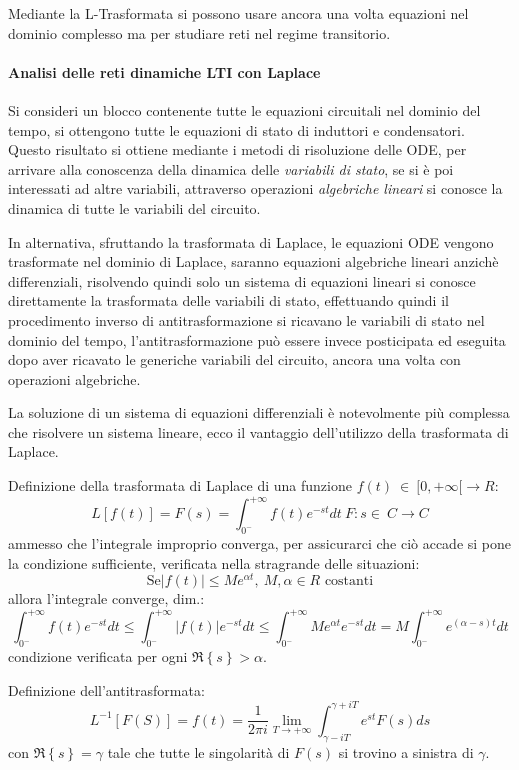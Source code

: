 Mediante la L-Trasformata si possono usare ancora una volta equazioni nel dominio complesso ma per 
studiare reti nel regime transitorio.

\paragraph{Analisi delle reti dinamiche LTI con Laplace}
Si consideri un blocco contenente tutte le equazioni circuitali nel dominio del tempo,
si ottengono tutte le equazioni di stato di induttori e condensatori.
Questo risultato si ottiene mediante i metodi di risoluzione delle ODE, per arrivare alla conoscenza
della dinamica delle \textit{variabili di stato}, se si è poi interessati ad altre variabili, attraverso
operazioni \textit{algebriche lineari} si conosce la dinamica di tutte le variabili del circuito.

In alternativa, sfruttando la trasformata di Laplace, le equazioni ODE vengono trasformate nel dominio
di Laplace, saranno equazioni algebriche lineari anzichè differenziali, risolvendo quindi solo un sistema
di equazioni lineari si conosce direttamente la trasformata delle variabili di stato, effettuando quindi
il procedimento inverso di antitrasformazione si ricavano le variabili di stato nel dominio del tempo,
l'antitrasformazione può essere invece posticipata ed eseguita dopo aver ricavato le generiche variabili
del circuito, ancora una volta con operazioni algebriche.

La soluzione di un sistema di equazioni differenziali è notevolmente più complessa che risolvere un 
sistema lineare, ecco il vantaggio dell'utilizzo della trasformata di Laplace.

Definizione della trasformata di Laplace di una funzione $f(t)\ \in\ [0,+\infty[\to R$:
$$
L[f(t)] = F(s) = \int_{0^-}^{+\infty} f(t) e^{-st}dt \ F:s \in\ C \to C
$$
ammesso che l'integrale improprio converga, per assicurarci che ciò accade si pone la condizione sufficiente, verificata nella stragrande delle situazioni:
$$
\text{Se} \left|f(t) \right| \leq Me^{\alpha t} ,\ M,\alpha \in R \text{ costanti}
$$
allora l'integrale converge, dim.:
$$
\int_{0^-}^{+\infty} f(t) e^{-st}dt \leq \int_{0^-}^{+\infty} \left|f(t)\right| e^{-st}dt \leq
\int_{0^-}^{+\infty} Me^{\alpha t} e^{-st}dt = M\int_{0^-}^{+\infty} e^{(\alpha-s)t}dt
$$
condizione verificata per ogni $\Re \left\{ s\right\} > \alpha$.

Definizione dell'antitrasformata:
$$
L^{-1}\left[F(S) \right] = f(t) = \frac{1}{2\pi i} \lim_{T\to+\infty} \int_{\gamma-iT}^{\gamma+iT}
e^{st}F(s)ds
$$
con $\Re\left\{s\right\} = \gamma$ tale che tutte le singolarità di $F(s)$ si trovino a sinistra di $\gamma$.

